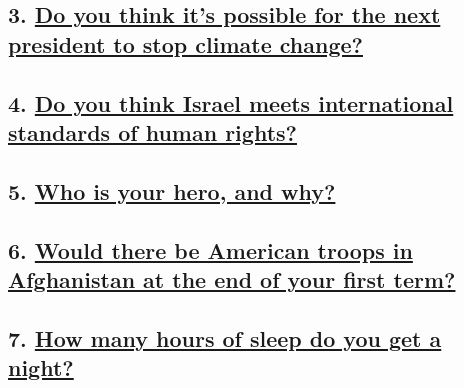 \hypertarget{3-do-you-think-its-possible-for-the-next-president-to-stop-climate-change}{%
\subsection{\texorpdfstring{3.
\href{https://www.nytimes.com/interactive/2019/us/politics/climate-change-democratic-candidates.html}{Do
you think it's possible for the next president to stop climate
change?}}{3. Do you think it's possible for the next president to stop climate change?}}\label{3-do-you-think-its-possible-for-the-next-president-to-stop-climate-change}}

\hypertarget{4-do-you-think-israel-meets-international-standards-of-human-rights}{%
\subsection{\texorpdfstring{4.
\href{https://www.nytimes.com/interactive/2019/us/politics/israel-human-rights-democratic-candidates.html}{Do
you think Israel meets international standards of human
rights?}}{4. Do you think Israel meets international standards of human rights?}}\label{4-do-you-think-israel-meets-international-standards-of-human-rights}}

\hypertarget{5-who-is-your-hero-and-why}{%
\subsection{\texorpdfstring{5.
\href{https://www.nytimes.com/interactive/2019/us/politics/hero-democratic-candidates.html\%0A}{Who
is your hero, and
why?}}{5. Who is your hero, and why?}}\label{5-who-is-your-hero-and-why}}

\hypertarget{6-would-there-be-american-troops-in-afghanistan-at-the-end-of-your-first-term}{%
\subsection{\texorpdfstring{6.
\href{https://www.nytimes.com/interactive/2019/us/politics/afghanistan-democratic-candidates.html}{Would
there be American troops in Afghanistan at the end of your first
term?}}{6. Would there be American troops in Afghanistan at the end of your first term?}}\label{6-would-there-be-american-troops-in-afghanistan-at-the-end-of-your-first-term}}

\hypertarget{7-how-many-hours-of-sleep-do-you-get-a-night}{%
\subsection{\texorpdfstring{7.
\href{https://www.nytimes.com/interactive/2019/us/politics/sleep-democratic-candidates.html}{How
many hours of sleep do you get a
night?}}{7. How many hours of sleep do you get a night?}}\label{7-how-many-hours-of-sleep-do-you-get-a-night}}

